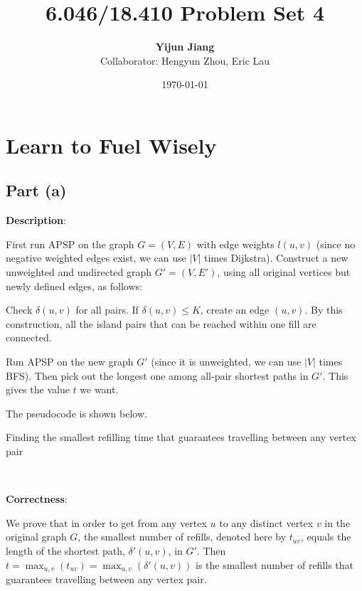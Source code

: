 \documentclass{article}
\title{6.046/18.410 Problem Set 4}
\author{\textbf{Yijun Jiang}\\Collaborator: Hengyun Zhou, Eric Lau}
\date{\today}
\begin{document}
\maketitle
\section{Learn to Fuel Wisely}
\subsection{Part (a)}
\noindent\textbf{Description}:

First run APSP on the graph $G=(V,E)$ with edge weights $l(u,v)$ (since no negative weighted edges exist, we can use $|V|$ times Dijkstra). Construct a new unweighted and undirected graph $G'=(V,E')$, using all original vertices but newly defined edges, as follows:

Check $\delta(u,v)$ for all pairs. If $\delta(u,v)\leqslant K$, create an edge $(u,v)$. By this construction, all the island pairs that can be reached within one fill are connected.

Run APSP on the new graph $G'$ (since it is unweighted, we can use $|V|$ times BFS). Then pick out the longest one among all-pair shortest paths in $G'$. This gives the value $t$ we want.

The pseudocode is shown below.
\begin{algorithm}
\caption{Finding the smallest refilling time that guarantees travelling between any vertex pair}
\begin{algorithmic}[1]
		\EndIf
	\EndFor
\EndFor
{}
\EndProcedure
\end{algorithmic}
\end{algorithm}

~

\noindent\textbf{Correctness}:

We prove that in order to get from any vertex $u$ to any distinct vertex $v$ in the original graph $G$, the smallest number of refills, denoted here by $t_{uv}$, equals the length of the shortest path, $\delta'(u,v)$, in $G'$. Then $t=\displaystyle{\max_{u,v}}(t_{uv})=\displaystyle{\max_{u,v}}(\delta'(u,v))$ is the smallest number of refills that guarantees travelling between any vertex pair.
\end{document}
